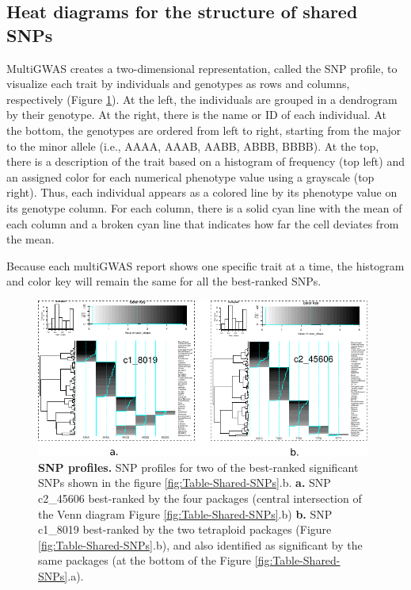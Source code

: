 \documentclass{article}
\begin{document}
\subsection{Heat diagrams for the structure of shared SNPs}

MultiGWAS creates a two-dimensional representation, called the SNP profile, to visualize each trait by individuals and genotypes as rows and columns, respectively (Figure \ref{fig:SNP-profiles}). At the left, the individuals are grouped in a dendrogram by their genotype. At the right, there is the name or ID of each individual. At the bottom, the genotypes are ordered from left to right, starting from the major to the minor allele (i.e., AAAA, AAAB, AABB, ABBB, BBBB). At the top, there is a description of the trait based on a histogram of frequency (top left) and an assigned color for each numerical phenotype value using a grayscale (top right). Thus, each individual appears as a colored line by its phenotype value on its genotype column. For each column, there is a solid cyan line with the mean of each column and a broken cyan line that indicates how far the cell deviates from the
mean.

Because each multiGWAS report shows one specific trait at a time, the histogram and color key will remain the same for all the best-ranked
SNPs.

\begin{figure}[H]
\begin{centering}
\includegraphics[width=11cm]{07_figure-heat-maps}
\par\end{centering}
\caption{\textbf{SNP profiles. }{SNP profiles for two of the best-ranked significant SNPs shown in the figure \ref{fig:Table-Shared-SNPs}.b.
\textbf{a.} SNP c2\_45606 best-ranked by the four packages (central intersection of the Venn diagram Figure \ref{fig:Table-Shared-SNPs}.b) \textbf{b.} SNP c1\_8019 best-ranked by the two tetraploid packages (Figure \ref{fig:Table-Shared-SNPs}.b), and also identified as significant by the same packages (at the bottom of the Figure  \ref{fig:Table-Shared-SNPs}.a). \label{fig:SNP-profiles}}}
\end{figure}
\end{document}
